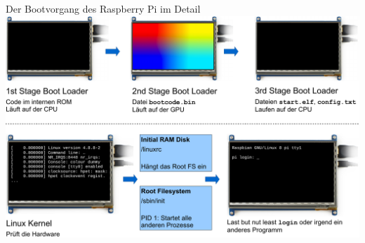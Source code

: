 \begin{frame}{Der Bootvorgang des Raspberry Pi im Detail}
    \includegraphics[width=\textwidth]{img/pi-bootvorgang}
\end{frame}

